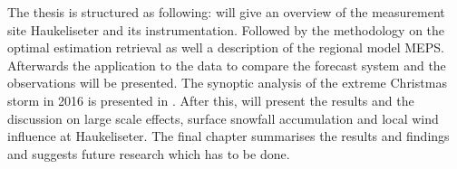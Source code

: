 \noindent
The thesis is structured as following:  will give an overview of the measurement site Haukeliseter and its instrumentation. Followed by the methodology on the optimal estimation retrieval as well a description of the regional model MEPS. Afterwards the application to the data to compare the forecast system and the observations will be presented. The synoptic analysis of the extreme Christmas storm in 2016 is presented in . After this, will  present the results and the discussion on large scale effects, surface snowfall accumulation and local wind influence  at Haukeliseter. The final chapter summarises the results and findings and suggests future research which has to be done.



% 
%  
%  
